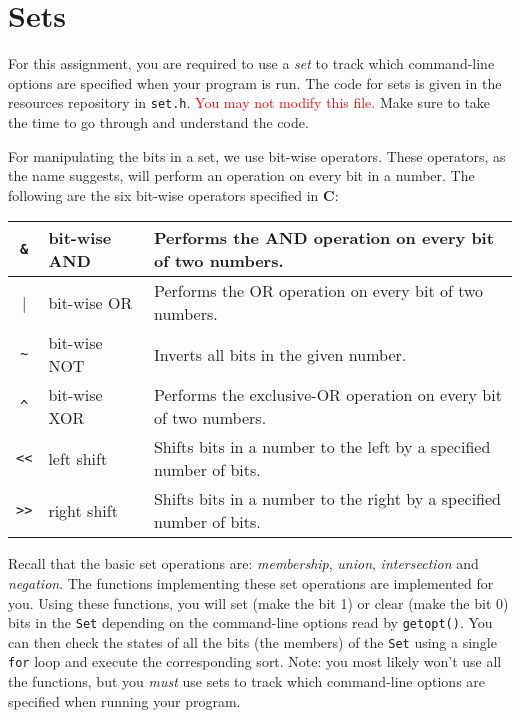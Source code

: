 \section{Sets}

For this assignment, you are required to use a \emph{set} to track which
command-line options are specified when your program is run. The code
for sets is given in the resources repository in \texttt{set.h}.
\textcolor{red}{You may not modify this file.} Make sure to take the
time to go through and understand the code.

For manipulating the bits in a set, we use bit-wise operators. These
operators, as the name suggests, will perform an operation on every bit
in a number. The following are the six bit-wise operators specified in
\textbf{C}:

\begin{center}
  \begin{tabular}{|c|l|l|}
    \hline
    \verb|&| & bit-wise AND & Performs the AND operation on every bit
    of two numbers. \\
    \hline
    \verb||| & bit-wise OR & Performs the OR operation on every bit of
    two numbers. \\
    \hline
    \verb|~| & bit-wise NOT & Inverts all bits in the given number. \\
    \hline
    \verb|^| & bit-wise XOR & Performs the exclusive-OR operation on
    every bit of two numbers. \\
    \hline
    \verb|<<| & left shift & Shifts bits in a number to the left by a
    specified number of bits. \\
    \hline
    \verb|>>| & right shift & Shifts bits in a number to the right by a
    specified number of bits. \\
    \hline
  \end{tabular}
\end{center}

\noindent Recall that the basic set operations are: \emph{membership},
\emph{union}, \emph{intersection} and \emph{negation}. The functions
implementing these set operations are implemented for you. Using these
functions, you will set (make the bit 1) or clear (make the bit 0) bits
in the \texttt{Set} depending on the command-line options read by
\texttt{getopt()}. You can then check the states of all the bits (the
members) of the \texttt{Set} using a single \texttt{for} loop and
execute the corresponding sort. Note: you most likely won't use all the
functions, but you \emph{must} use sets to track which command-line
options are specified when running your program.

